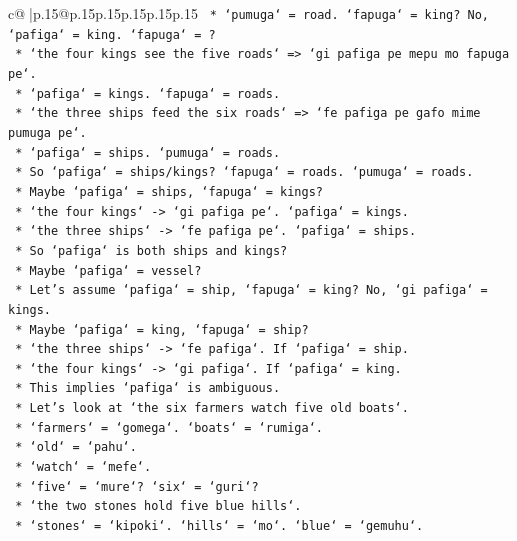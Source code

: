 \documentclass{article}
\begin{document}
{\begin{supertabular}{c@{$\;$}|p{.15\linewidth}@{}p{.15\linewidth}p{.15\linewidth}p{.15\linewidth}p{.15\linewidth}p{.15\linewidth}}
{{{\texttt{            *   `pumuga` = road. `fapuga` = king? No, `pafiga` = king. `fapuga` = ?} \\
\texttt{            *   `the four kings see the five roads` => `gi pafiga pe mepu mo fapuga pe`.} \\
\texttt{            *   `pafiga` = kings. `fapuga` = roads.} \\
\texttt{            *   `the three ships feed the six roads` => `fe pafiga pe gafo mime pumuga pe`.} \\
\texttt{            *   `pafiga` = ships. `pumuga` = roads.} \\
\texttt{            *   So `pafiga` = ships/kings? `fapuga` = roads. `pumuga` = roads.} \\
\texttt{            *   Maybe `pafiga` = ships, `fapuga` = kings?} \\
\texttt{            *   `the four kings` {-}> `gi pafiga pe`. `pafiga` = kings.} \\
\texttt{            *   `the three ships` {-}> `fe pafiga pe`. `pafiga` = ships.} \\
\texttt{            *   So `pafiga` is both ships and kings?} \\
\texttt{            *   Maybe `pafiga` = vessel?} \\
\texttt{            *   Let's assume `pafiga` = ship, `fapuga` = king? No, `gi pafiga` = kings.} \\
\texttt{            *   Maybe `pafiga` = king, `fapuga` = ship?} \\
\texttt{            *   `the three ships` {-}> `fe pafiga`. If `pafiga` = ship.} \\
\texttt{            *   `the four kings` {-}> `gi pafiga`. If `pafiga` = king.} \\
\texttt{            *   This implies `pafiga` is ambiguous.} \\
\texttt{            *   Let's look at `the six farmers watch five old boats`.} \\
\texttt{            *   `farmers` = `gomega`. `boats` = `rumiga`.} \\
\texttt{            *   `old` = `pahu`.} \\
\texttt{            *   `watch` = `mefe`.} \\
\texttt{            *   `five` = `mure`? `six` = `guri`?} \\
\texttt{            *   `the two stones hold five blue hills`.} \\
\texttt{            *   `stones` = `kipoki`. `hills` = `mo`. `blue` = `gemuhu`.} \\
}}}
\end{supertabular}}
\end{document}
